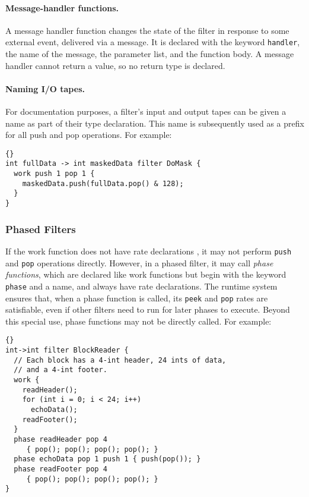 \documentclass[11pt]{article}
\newcommand{\new}{\marginpar{\footnotesize \textbf{~~--~New~--}}}
\newcommand{\old}{\marginpar{\footnotesize \textbf{~~--~Old~--}}}
\begin{document}
\paragraph{Message-handler functions.}  A message handler function
changes the state of the filter in response to some external event,
delivered via a message.  It is declared with the keyword
\lstinline|handler|, the name of the message, the parameter list, and
the function body.  A message handler cannot return a value, so no
return type is declared.

\paragraph{Naming I/O tapes.}  For {\new} documentation 
purposes, a filter's input and output tapes can be given a name as
part of their type declaration.  This name is subsequently used as a
prefix for all push and pop operations.  For example:
\begin{lstlisting}{}
int fullData -> int maskedData filter DoMask {
  work push 1 pop 1 {
    maskedData.push(fullData.pop() & 128);
  }
}
\end{lstlisting}

\subsubsection{Phased Filters}  
\label{sec:phased-filter}

If the work function does not have rate declarations {\old}, it may not
perform \lstinline|push| and \lstinline|pop| operations directly.
However, in a phased filter, it may call \emph{phase functions}, which
are declared like work functions but begin with the keyword
\lstinline|phase| and a name, and always have rate declarations.  The
runtime system ensures that, when a phase function is called, its
\lstinline|peek| and \lstinline|pop| rates are satisfiable, even if
other filters need to run for later phases to execute.  Beyond this
special use, phase functions may not be directly called.  For example:

\begin{lstlisting}{}
int->int filter BlockReader {
  // Each block has a 4-int header, 24 ints of data,
  // and a 4-int footer.
  work {
    readHeader();
    for (int i = 0; i < 24; i++)
      echoData();
    readFooter();
  }
  phase readHeader pop 4
     { pop(); pop(); pop(); pop(); }
  phase echoData pop 1 push 1 { push(pop()); }
  phase readFooter pop 4
     { pop(); pop(); pop(); pop(); }
}
\end{lstlisting}
\end{document}

